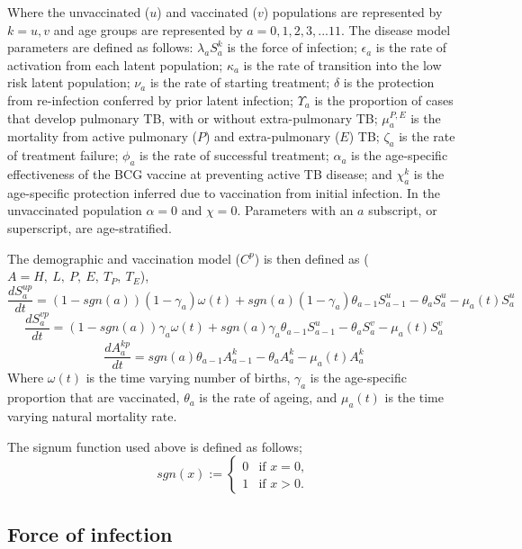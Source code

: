\documentclass[11pt,twoside]{bristolthesis}
\begin{document}
  Where the unvaccinated (\(u\)) and vaccinated (\(v\)) populations are represented by \(k = u,v\) and age groups are represented by \(a=0,1,2,3, ... 11\). The disease model parameters are defined as follows: \(\lambda_a S^k_a\) is the force of infection; \(\epsilon_a\) is the rate of activation from each latent population; \(\kappa_a\) is the rate of transition into the low risk latent population; \(\nu_a\) is the rate of starting treatment; \(\delta\) is the protection from re-infection conferred by prior latent infection; \(\Upsilon_a\) is the proportion of cases that develop pulmonary TB, with or without extra-pulmonary TB; \(\mu^{P,E}_a\) is the mortality from active pulmonary (\(P\)) and extra-pulmonary (\(E\)) TB; \(\zeta_a\) is the rate of treatment failure; \(\phi_a\) is the rate of successful treatment; \(\alpha_a\) is the age-specific effectiveness of the BCG vaccine at preventing active TB disease; and \(\chi^k_a\) is the age-specific protection inferred due to vaccination from initial infection. In the unvaccinated population \(\alpha = 0\) and \(\chi = 0\). Parameters with an \(a\) subscript, or superscript, are age-stratified.
  
  The demographic and vaccination model (\(C^p\)) is then defined as (\(A = H,\ L,\ P,\ E,\ T_P,\ T_E\)),
  \begin{equation}
  \frac{dS^{up}_{a}}{dt} = (1 - sgn(a)) (1 - \gamma_a)\omega(t) + sgn(a) (1 - \gamma_a)\theta_{a - 1} S^u_{a - 1} - \theta_a S^u_a -\mu_{a}(t) S^u_a
    \label{eq:sus-age-u-model}
  \end{equation}
  \begin{equation}
  \frac{dS^{vp}_{a}}{dt} = (1 - sgn(a)) \gamma_a\omega(t) + sgn(a)\gamma_a\theta_{a - 1} S^u_{a - 1} - \theta_a S^v_a -\mu_{a}(t) S^v_a
    \label{eq:sus-age-v-model}
  \end{equation}
  \begin{equation}
  \frac{dA^{kp}_{a}}{dt} = sgn(a)\theta_{a - 1} A^k_{a - 1} - \theta_a A^k_{a} - \mu_{a}(t) A^k_{a}
    \label{eq:other-age-model}
  \end{equation}
  Where \(\omega(t)\) is the time varying number of births, \(\gamma_a\) is the age-specific proportion that are vaccinated, \(\theta_a\) is the rate of ageing, and \(\mu_a(t)\) is the time varying natural mortality rate.
  
  The signum function used above is defined as follows;
  \begin{equation}
  sgn(x) := \begin{cases}
  0 & \text{if } x = 0, \\
  1 & \text{if } x > 0. \end{cases}
    \label{eq:signum}
  \end{equation}
  \hypertarget{force-of-infection}{%
  \subsection{Force of infection}\label{force-of-infection}}
  
\end{document}
